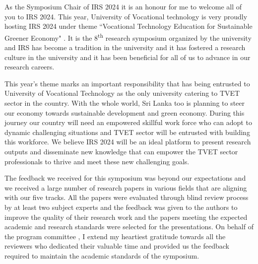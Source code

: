 \thispagestyle{fancy}
	




   
    



	
As the Symposium Chair of IRS 2024 it is  an honour for me to welcome all of you to IRS 2024. This year, University of Vocational technology is very proudly hosting IRS 2024  under theme “Vocational Technology Education for Sustainable Greener Economy" . It is the 8\textsuperscript{th} research symposium organized by the university  and  IRS has become a tradition in the university and it has fostered a research culture in the university and it has been beneficial for  all of us to advance in our research careers.

This year’s theme marks an important responsibility that has being entrusted to University of Vocational Technology as the only university catering to TVET sector in the country.  With the whole world, Sri Lanka too is planning to steer our economy towards sustainable development and green economy. During this journey our  country will  need an empowered skillful work force who  can adopt to dynamic challenging situations and  TVET sector will be entrusted with building this  workforce.  We believe IRS 2024 will be an ideal platform to present research outputs and disseminate new knowledge that can empower the TVET sector professionals  to thrive and meet these new challenging goals.

The feedback we received for this symposium was beyond our expectations and we received a large number of research papers in  various fields that are aligning with our five tracks. All the papers were evaluated through blind review process by at least two subject experts and the feedback was given to the authors to improve the quality of their research work and the papers meeting the expected academic and research standards were selected for the presentations. On behalf of the program committee , I extend my heartiest gratitude towards all the reviewers who dedicated their valuable time and provided us the feedback required to maintain the academic standards of the symposium.  


